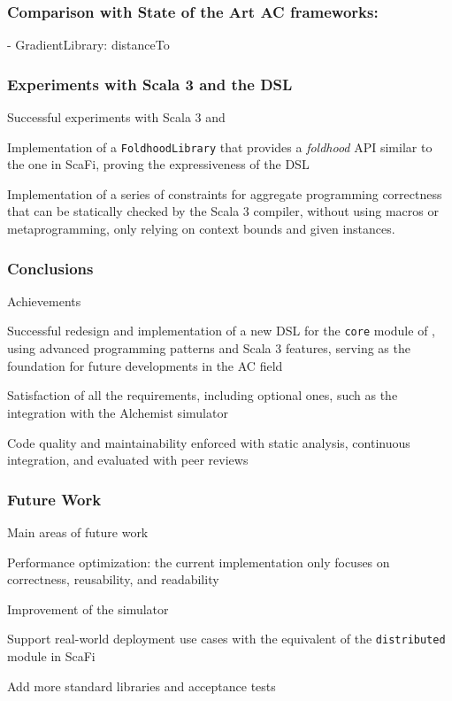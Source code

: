 \begin{frame}
    \frametitle{Comparison with State of the Art \ac{AC} frameworks: \this}
    \begin{exampleblock}{\this - GradientLibrary: distanceTo}
        
    \end{exampleblock}
\end{frame}

\begin{frame}
    \frametitle{Experiments with Scala 3 and the \ac{DSL}}
    \begin{blockitems}{Successful experiments with Scala 3 and \this}
        \item Implementation of a \texttt{FoldhoodLibrary} that provides a \textit{foldhood} \ac{API} similar to the one in ScaFi, proving the expressiveness of the \this \ac{DSL}
        \item Implementation of a series of constraints for aggregate programming correctness that can be statically checked by the Scala 3 compiler, without using macros or metaprogramming, only relying on context bounds and given instances.
    \end{blockitems}
\end{frame}

\begin{frame}
    \frametitle{Conclusions}
    \begin{blockitems}{Achievements}
        \item Successful redesign and implementation of a new \ac{DSL} for the \texttt{core} module of \this, using advanced programming patterns and Scala 3 features, serving as the foundation for future developments in the \ac{AC} field
        \item Satisfaction of all the requirements, including optional ones, such as the integration with the Alchemist simulator
        \item Code quality and maintainability enforced with static analysis, continuous integration, and evaluated with peer reviews
    \end{blockitems}
\end{frame}

\begin{frame}
    \frametitle{Future Work}
    \begin {blockitems}{Main areas of future work}
        \item Performance optimization: the current implementation only focuses on correctness, reusability, and readability
        \item Improvement of the simulator
        \item Support real-world deployment use cases with the equivalent of the \texttt{distributed} module in ScaFi
        \item Add more standard libraries and acceptance tests
    \end{blockitems}
\end{frame}

